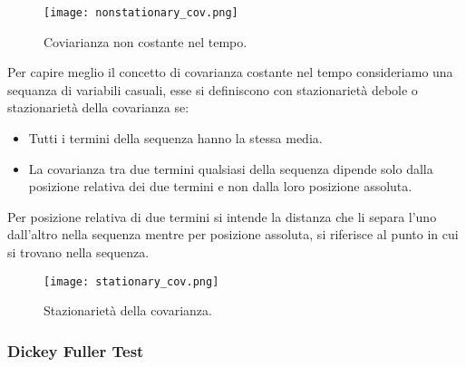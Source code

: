 \begin{enumerate}
    \begin{figure}[H]
        \centering
        \texttt{[image: nonstationary\_cov.png]}
        \caption{Coviarianza non costante nel tempo.}
        \label{fig:nons_cov}
    \end{figure}

    Per capire meglio il concetto di covarianza costante nel tempo 
    consideriamo una sequanza di variabili casuali, esse si definiscono
    con stazionarietà debole o stazionarietà della covarianza se:

    \begin{itemize}
        \setlength\itemsep{-0.6em}
        \item Tutti i termini della sequenza hanno la stessa media.
        \item La covarianza tra due termini qualsiasi della sequenza 
        dipende solo dalla posizione relativa dei due termini e non dalla 
        loro posizione assoluta.
    \end{itemize}

    Per posizione relativa di due termini si intende la distanza che 
    li separa l'uno dall'altro nella sequenza mentre per posizione assoluta, 
    si riferisce al punto in cui si trovano nella sequenza.

    \begin{figure}[H]
        \centering
        \texttt{[image: stationary\_cov.png]}
        \caption{Stazionarietà della covarianza.}
    \end{figure}

\end{enumerate}


\subsubsection{Dickey Fuller Test}
